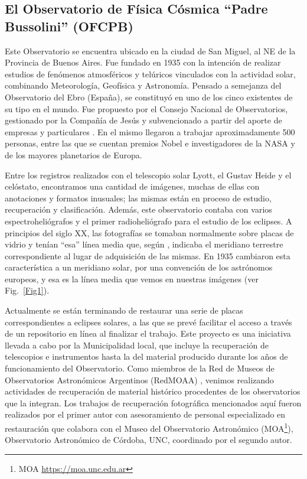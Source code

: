 \documentclass[baaa]{baaa}
\begin{document}
\subsection{El Observatorio de Física Cósmica ``Padre Bussolini'' (OFCPB)}\label{intro_b}
Este Observatorio se encuentra ubicado en la ciudad de San Miguel, al NE de la Provincia de Buenos Aires. Fue fundado en 1935 con la intención de realizar estudios de fenómenos atmosféricos 
y telúricos vinculados con la actividad solar, combinando Meteorología, Geofísica y Astronomía. Pensado a semejanza del Observatorio del Ebro (España), se constituyó en uno de los cinco existentes de su tipo en el mundo. Fue propuesto por el Consejo Nacional de Observatorios, gestionado por la Compañía de Jesús y subvencionado a partir del aporte de empresas y particulares \citep{Paolantonio2015}. 
En el mismo llegaron a trabajar aproximadamente 500 personas, entre las que se cuentan premios Nobel  e investigadores de la NASA y de los mayores planetarios de Europa.

Entre los registros realizados con el telescopio solar Lyott, el Gustav Heide y el celóstato, encontramos una cantidad de imágenes, muchas de ellas
con anotaciones y formatos inusuales; las mismas están en proceso de estudio, recuperación y clasificación. Además, este observatorio contaba con 
varios espectroheliógrafos y el primer radioheliógrafo para el estudio de los eclipses.
A principios del siglo XX, las fotografías se tomaban normalmente sobre placas de vidrio y tenían ``esa'' línea media que, según \citet{Iwa2020}, indicaba el meridiano terrestre correspondiente al lugar de adquisición de las mismas.
En 1935 cambiaron esta característica a un meridiano solar, por una convención de los astrónomos europeos, y esa es la línea media que vemos en nuestras imágenes (ver Fig.~\ref{Fig1}).

Actualmente se están terminando de restaurar una serie de placas correspondientes a eclipses solares, a las que se prevé facilitar el acceso a través de un repositorio en línea al finalizar el trabajo.
Este proyecto es una iniciativa llevada a cabo por la Municipalidad local, que incluye la recuperación de telescopios e instrumentos hasta la del material producido durante los años 
de funcionamiento del Observatorio.
Como miembros de la Red de Museos de Observatorios Astronómicos Argentinos (RedMOAA) \citep{2023BAAA...64..323M},
venimos realizando actividades de recuperación de material histórico procedentes de los observatorios que la integran. Los trabajos de recuperación fotográfica mencionados aquí fueron realizados por el primer autor con asesoramiento de personal especializado en restauración que colabora con el
Museo del Observatorio Astronómico (MOA\footnote{MOA \url{https://moa.unc.edu.ar}}), Observatorio Astronómico de Córdoba, UNC, coordinado por el segundo autor.
\end{document}
